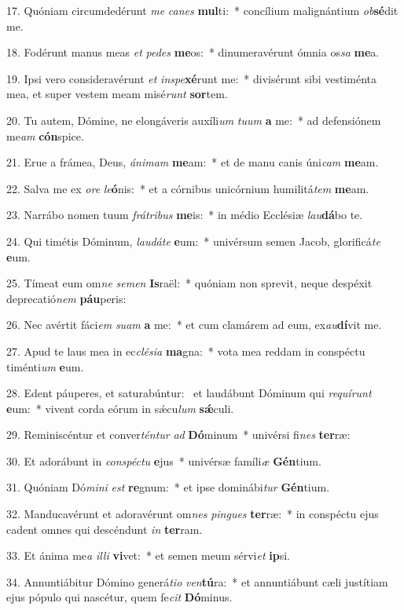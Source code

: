 17. Quóniam circumdedérunt \textit{me} \textit{ca}\textit{nes} \textbf{mul}ti:~*  concílium malignántium \textit{ob}\textbf{sé}dit me.\

18. Fodérunt manus meas \textit{et} \textit{pe}\textit{des} \textbf{me}os:~*  dinumeravérunt ómnia os\textit{sa} \textbf{me}a.\

19. Ipsi vero consideravérunt \textit{et} \textit{in}\textit{spe}\textbf{xé}runt me:~*  divisérunt sibi vestiménta mea, et super vestem meam misé\textit{runt} \textbf{sor}tem.\

20. Tu autem, Dómine, ne elongáveris auxíli\textit{um} \textit{tu}\textit{um} \textbf{a} me:~*  ad defensiónem me\textit{am} \textbf{cón}spice.\

21. Erue a frámea, Deus, \textit{á}\textit{ni}\textit{mam} \textbf{me}am:~*  et de manu canis úni\textit{cam} \textbf{me}am.\

22. Salva me ex \textit{o}\textit{re} \textit{le}\textbf{ó}nis:~*  et a córnibus unicórnium humilitá\textit{tem} \textbf{me}am.\

23. Narrábo nomen tuum \textit{frá}\textit{tri}\textit{bus} \textbf{me}is:~*  in médio Ecclésiæ \textit{lau}\textbf{dá}bo te.\

24. Qui timétis Dóminum, \textit{lau}\textit{dá}\textit{te} \textbf{e}um:~*  univérsum semen Jacob, glorificá\textit{te} \textbf{e}um.\

25. Tímeat eum om\textit{ne} \textit{se}\textit{men} \textbf{Is}raël:~*  quóniam non sprevit, neque despéxit deprecatió\textit{nem} \textbf{páu}peris:\

26. Nec avértit fáci\textit{em} \textit{su}\textit{am} \textbf{a} me:~*  et cum clamárem ad eum, ex\textit{au}\textbf{dí}vit me.\

27. Apud te laus mea in ec\textit{clé}\textit{si}\textit{a} \textbf{ma}gna:~*  vota mea reddam in conspéctu timénti\textit{um} \textbf{e}um.\

28. Edent páuperes, et saturabúntur: \dag\  et laudábunt Dóminum qui \textit{re}\textit{quí}\textit{runt} \textbf{e}um:~*  vivent corda eórum in sǽcu\textit{lum} \textbf{sǽ}culi.\

29. Reminiscéntur et conver\textit{tén}\textit{tur} \textit{ad} \textbf{Dó}minum~*  univérsi fi\textit{nes} \textbf{ter}ræ:\

30. Et adorábunt in \textit{con}\textit{spéc}\textit{tu} \textbf{e}jus~*  univérsæ famíli\textit{æ} \textbf{Gén}tium.\

31. Quóniam Dó\textit{mi}\textit{ni} \textit{est} \textbf{re}gnum:~*  et ipse dominábi\textit{tur} \textbf{Gén}tium.\

32. Manducavérunt et adoravérunt om\textit{nes} \textit{pin}\textit{gues} \textbf{ter}ræ:~*  in conspéctu ejus cadent omnes qui descéndunt \textit{in} \textbf{ter}ram.\

33. Et ánima me\textit{a} \textit{il}\textit{li} \textbf{vi}vet:~*  et semen meum sérvi\textit{et} \textbf{ip}si.\

34. Annuntiábitur Dómino generá\textit{ti}\textit{o} \textit{ven}\textbf{tú}ra:~*  et annuntiábunt cæli justítiam ejus pópulo qui nascétur, quem fe\textit{cit} \textbf{Dó}minus.\

